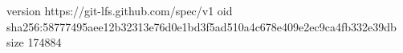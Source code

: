 version https://git-lfs.github.com/spec/v1
oid sha256:58777495aee12b32313e76d0e1bd3f5ad510a4c678e409e2ec9ca4fb332e39db
size 174884
